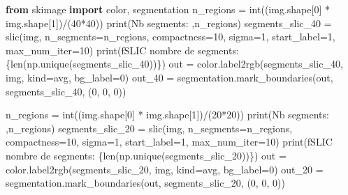 \documentclass[
]{article}
\newenvironment{Shaded}{}{}
\newcommand{\BuiltInTok}[1]{\textcolor[rgb]{0.00,0.50,0.00}{#1}}
\newcommand{\DecValTok}[1]{\textcolor[rgb]{0.25,0.63,0.44}{#1}}
\newcommand{\ImportTok}[1]{\textcolor[rgb]{0.00,0.50,0.00}{\textbf{#1}}}
\newcommand{\NormalTok}[1]{#1}
\newcommand{\OperatorTok}[1]{\textcolor[rgb]{0.40,0.40,0.40}{#1}}
\newcommand{\SpecialCharTok}[1]{\textcolor[rgb]{0.25,0.44,0.63}{#1}}
\newcommand{\SpecialStringTok}[1]{\textcolor[rgb]{0.73,0.40,0.53}{#1}}
\newcommand{\StringTok}[1]{\textcolor[rgb]{0.25,0.44,0.63}{#1}}
\begin{document}
\label{b416dd44}
\label{cb31}
\begin{Shaded}
\begin{Highlighting}[]
\ImportTok{from}\NormalTok{ skimage }\ImportTok{import}\NormalTok{ color, segmentation}
\NormalTok{n\_regions }\OperatorTok{=} \BuiltInTok{int}\NormalTok{((img.shape[}\DecValTok{0}\NormalTok{] }\OperatorTok{*}\NormalTok{ img.shape[}\DecValTok{1}\NormalTok{])}\OperatorTok{/}\NormalTok{(}\DecValTok{40}\OperatorTok{*}\DecValTok{40}\NormalTok{))}
\BuiltInTok{print}\NormalTok{(}\StringTok{\textquotesingle{}Nb segments: \textquotesingle{}}\NormalTok{,n\_regions)}
\NormalTok{segments\_slic\_40 }\OperatorTok{=}\NormalTok{ slic(img, n\_segments}\OperatorTok{=}\NormalTok{n\_regions, compactness}\OperatorTok{=}\DecValTok{10}\NormalTok{, sigma}\OperatorTok{=}\DecValTok{1}\NormalTok{, start\_label}\OperatorTok{=}\DecValTok{1}\NormalTok{, max\_num\_iter}\OperatorTok{=}\DecValTok{10}\NormalTok{)}
\BuiltInTok{print}\NormalTok{(}\SpecialStringTok{f\textquotesingle{}SLIC nombre de segments: }\SpecialCharTok{\{}\BuiltInTok{len}\NormalTok{(np.unique(segments\_slic\_40))}\SpecialCharTok{\}}\SpecialStringTok{\textquotesingle{}}\NormalTok{)}
\NormalTok{out }\OperatorTok{=}\NormalTok{ color.label2rgb(segments\_slic\_40, img, kind}\OperatorTok{=}\StringTok{\textquotesingle{}avg\textquotesingle{}}\NormalTok{, bg\_label}\OperatorTok{=}\DecValTok{0}\NormalTok{)}
\NormalTok{out\_40 }\OperatorTok{=}\NormalTok{ segmentation.mark\_boundaries(out, segments\_slic\_40, (}\DecValTok{0}\NormalTok{, }\DecValTok{0}\NormalTok{, }\DecValTok{0}\NormalTok{))}

\NormalTok{n\_regions }\OperatorTok{=} \BuiltInTok{int}\NormalTok{((img.shape[}\DecValTok{0}\NormalTok{] }\OperatorTok{*}\NormalTok{ img.shape[}\DecValTok{1}\NormalTok{])}\OperatorTok{/}\NormalTok{(}\DecValTok{20}\OperatorTok{*}\DecValTok{20}\NormalTok{))}
\BuiltInTok{print}\NormalTok{(}\StringTok{\textquotesingle{}Nb segments: \textquotesingle{}}\NormalTok{,n\_regions)}
\NormalTok{segments\_slic\_20 }\OperatorTok{=}\NormalTok{ slic(img, n\_segments}\OperatorTok{=}\NormalTok{n\_regions, compactness}\OperatorTok{=}\DecValTok{10}\NormalTok{, sigma}\OperatorTok{=}\DecValTok{1}\NormalTok{, start\_label}\OperatorTok{=}\DecValTok{1}\NormalTok{, max\_num\_iter}\OperatorTok{=}\DecValTok{10}\NormalTok{)}
\BuiltInTok{print}\NormalTok{(}\SpecialStringTok{f\textquotesingle{}SLIC nombre de segments: }\SpecialCharTok{\{}\BuiltInTok{len}\NormalTok{(np.unique(segments\_slic\_20))}\SpecialCharTok{\}}\SpecialStringTok{\textquotesingle{}}\NormalTok{)}
\NormalTok{out }\OperatorTok{=}\NormalTok{ color.label2rgb(segments\_slic\_20, img, kind}\OperatorTok{=}\StringTok{\textquotesingle{}avg\textquotesingle{}}\NormalTok{, bg\_label}\OperatorTok{=}\DecValTok{0}\NormalTok{)}
\NormalTok{out\_20 }\OperatorTok{=}\NormalTok{ segmentation.mark\_boundaries(out, segments\_slic\_20, (}\DecValTok{0}\NormalTok{, }\DecValTok{0}\NormalTok{, }\DecValTok{0}\NormalTok{))}


\end{Highlighting}
\end{Shaded}
\end{document}

